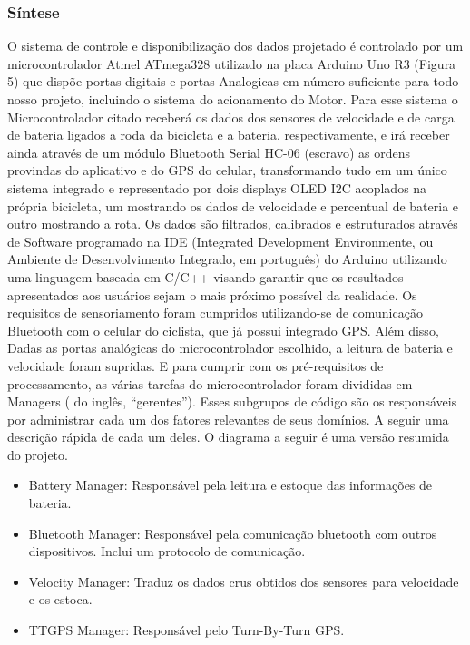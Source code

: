  		\subsubsection{Síntese}
 		O sistema de controle e disponibilização dos dados projetado é controlado por um microcontrolador Atmel ATmega328 utilizado na placa Arduino Uno R3 (Figura 5) que dispõe portas digitais e portas Analogicas em número suficiente para todo nosso projeto, incluindo o sistema do acionamento do Motor. Para esse sistema o Microcontrolador citado receberá os dados dos sensores de velocidade e de carga de bateria ligados a roda da bicicleta e a bateria, respectivamente, e irá receber ainda através de um módulo Bluetooth Serial HC-06 (escravo) as ordens provindas do aplicativo e do GPS do celular, transformando tudo em um único sistema integrado e representado por dois displays OLED I2C acoplados na própria bicicleta, um mostrando os dados de velocidade e percentual de bateria e outro mostrando a rota. Os dados são filtrados, calibrados e estruturados através de Software programado na IDE (Integrated Development Environmente, ou Ambiente de Desenvolvimento Integrado, em português) do Arduino utilizando uma linguagem baseada em C/C++ visando garantir que os resultados apresentados aos usuários sejam o mais próximo possível da realidade.
 		Os requisitos de sensoriamento foram cumpridos utilizando-se de comunicação Bluetooth com o celular do ciclista, que já possui integrado GPS. Além disso, Dadas as portas analógicas do microcontrolador escolhido, a leitura de bateria e velocidade foram supridas. E para cumprir com os pré-requisitos de processamento, as várias tarefas do microcontrolador foram divididas em Managers ( do inglês, “gerentes”). Esses subgrupos de código são os responsáveis por administrar cada um dos fatores relevantes de seus domínios. A seguir uma descrição rápida de cada um deles. O diagrama a seguir é uma versão resumida do projeto.
 		\begin{itemize}
 			\item Battery Manager: Responsável pela leitura e estoque das informações de bateria.
 			\item Bluetooth Manager: Responsável pela comunicação bluetooth com outros dispositivos. Inclui um protocolo de comunicação.
 			\item Velocity Manager: Traduz os dados crus obtidos dos sensores para velocidade e os estoca.
 			\item TTGPS Manager: Responsável pelo Turn-By-Turn GPS. 
 		\end{itemize}
 	
